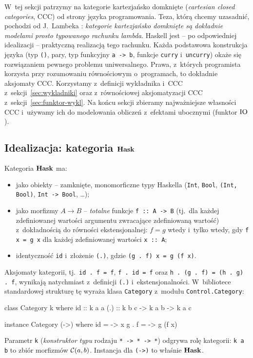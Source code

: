 W~tej sekcji patrzymy na kategorie kartezjańsko domknięte (\emph{cartesian closed categories}, CCC) od strony języka programowania. Teza, którą chcemy uzasadnić, pochodzi od J.~Lambeka \cite{tk-lambek80}: \emph{kategorie kartezjańsko domknięte są dokładnie modelami prosto typowanego rachunku lambda}. Haskell jest -- po odpowiedniej idealizacji -- praktyczną realizacją tego rachunku. Każda podstawowa konstrukcja języka (typ \lstinline{()}, pary, typ funkcyjny \lstinline{a -> b}, funkcje \lstinline{curry} i~\lstinline{uncurry}) okaże się rozwiązaniem pewnego problemu uniwersalnego. Prawa, z~których programista korzysta przy rozumowaniu równościowym o~programach, to dokładnie aksjomaty CCC. Korzystamy z~definicji wykładnika i~CCC z~sekcji~\ref{sec:wykladniki} oraz z~równościowej aksjomatyzacji CCC z~sekcji~\ref{sec:funktor-wykl}. Na końcu sekcji zbieramy najważniejsze własności CCC i~używamy ich do modelowania obliczeń z~efektami ubocznymi (funktor $\IO$).

\subsection*{Idealizacja: kategoria \texorpdfstring{$\mathbf{Hask}$}{Hask}}

\begin{definicja}[robocza]\label{def:hask}
Kategoria $\mathbf{Hask}$ ma:
\begin{itemize}
\item jako obiekty -- zamknięte, monomorficzne typy Haskella (\lstinline{Int}, \lstinline{Bool}, \lstinline{(Int, Bool)}, \lstinline{Int -> Bool}, \dots);
\item jako morfizmy $A \to B$ -- \emph{totalne} funkcje \lstinline{f :: A -> B} (tj.\ dla każdej zdefiniowanej wartości argumentu zwracające zdefiniowaną wartość) z~dokładnością do równości ekstensjonalnej: $f = g$ wtedy i~tylko wtedy, gdy \lstinline{f x = g x} dla każdej zdefiniowanej wartości \lstinline{x :: A};
\item identyczność \lstinline{id} i~złożenie \lstinline{(.)}, gdzie \lstinline{(g . f) x = g (f x)}.
\end{itemize}
\end{definicja}

Aksjomaty kategorii, tj.\ \lstinline{id . f = f}, \lstinline{f . id = f} oraz \lstinline{h . (g . f) = (h . g) . f}, wynikają natychmiast z~definicji \lstinline{(.)} i~ekstensjonalności. W~bibliotece standardowej strukturę tę wyraża klasa \lstinline{Category} z~modułu \lstinline{Control.Category}:
\begin{haskell}
class Category k where
  id  :: k a a
  (.) :: k b c -> k a b -> k a c

instance Category (->) where
  id    = \x -> x
  g . f = \x -> g (f x)
\end{haskell}
Parametr \lstinline{k} (\emph{konstruktor typu} rodzaju \lstinline{* -> * -> *}) odgrywa rolę kategorii: \lstinline{k a b} to zbiór morfizmów $\mathcal{C}(a, b)$. Instancja dla \lstinline{(->)} to właśnie $\mathbf{Hask}$.

